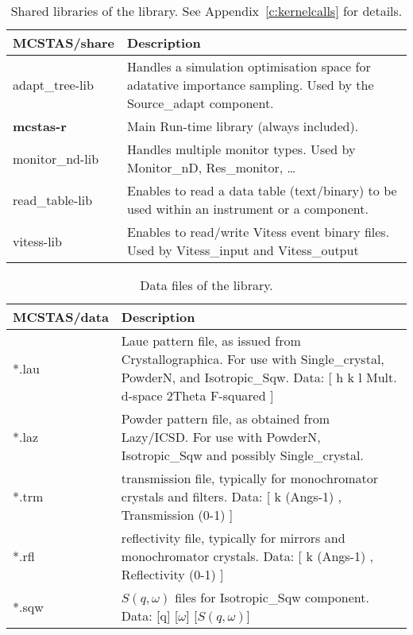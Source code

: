 \begin{table}
  \begin{center}
    {\let\my=\\
    \begin{tabular}{|p{}|p{}|}
      \hline
       \textbf{MCSTAS/share} & Description \\
       \hline
       adapt\_tree-lib  & Handles a simulation optimisation space for
       adatative importance sampling.
                          Used by the Source\_adapt component. \\
       \textbf{mcstas-r}      &   Main Run-time library (always included). \\
       monitor\_nd-lib & Handles multiple monitor types.
                        Used by Monitor\_nD, Res\_monitor, \ldots \\
       read\_table-lib  & Enables to read a data table (text/binary) to be used within
                          an instrument or a component. \\
       vitess-lib &     Enables to read/write Vitess event binary files.
                        Used by Vitess\_input and Vitess\_output \\
      \hline
    \end{tabular}
    \caption{Shared libraries of the \MCS library. See Appendix~\ref{c:kernelcalls} for details.}
    \label{t:comp-share}
    }
  \end{center}
\end{table}

\begin{table}
  \begin{center}
    {\let\my=\\
    \begin{tabular}{|p{}|p{}|}
      \hline
       \textbf{MCSTAS/data} & Description \\
       \hline
 *.lau & Laue pattern file, as issued from Crystallographica.
       For use with Single\_crystal, PowderN, and Isotropic\_Sqw.
       Data: [ h   k   l Mult. d-space 2Theta   F-squared ] \\
 *.laz & Powder pattern file, as obtained from Lazy/ICSD.
       For use with PowderN, Isotropic\_Sqw and possibly Single\_crystal.\\
 *.trm & transmission file, typically for monochromator crystals and filters.
       Data: [ k (Angs-1) , Transmission (0-1) ] \\
 *.rfl & reflectivity file, typically for mirrors and monochromator crystals.
       Data: [ k (Angs-1) , Reflectivity (0-1) ] \\
 *.sqw & $S(q,\omega)$ files for Isotropic\_Sqw component.
       Data: [q] [$\omega$] [$S(q,\omega)$]\\
      \hline
    \end{tabular}
    \caption{Data files of the \MCS library.}
    \label{t:comp-data}
    }
  \end{center}
\end{table}


